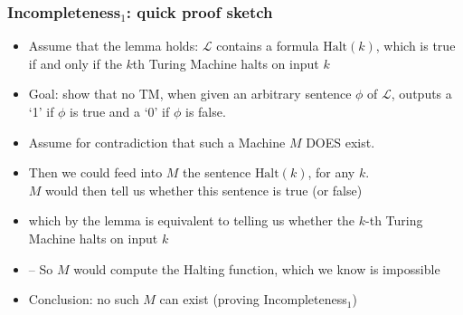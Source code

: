 \begin{frame}
\frametitle{Incompleteness$_1$: quick proof sketch}

\begin{itemize}[<+->]

\item Assume that the lemma holds: $\mathcal{L}$ contains a formula \(\mbox{Halt}(k)\), which is true if and only if the $k$th Turing Machine halts on input \(k\)

\item Goal: show that no TM, when given an arbitrary sentence $\phi$ of $\mathcal{L}$, outputs a `1' if $\phi$ is true and a `0' if $\phi$ is false. 

\item Assume for contradiction that such a Machine $M$ DOES exist. 

\item Then we could feed into $M$ the sentence \(\mbox{Halt}(k)\), for any $k$. \\ $M$ would then tell us whether this sentence is true (or false)
\item[] which by the lemma is equivalent to telling us whether the $k$-th Turing Machine halts on input $k$

\item[] -- So $M$ would compute the Halting function, which we know is impossible

\item Conclusion: no such $M$ can exist (proving Incompleteness$_1$)

\end{itemize}
\end{frame}



